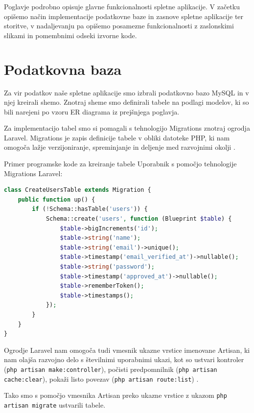 \documentclass[a4paper, 12pt]{book}
\begin{document}
Poglavje podrobno opisuje glavne funkcionalnosti spletne aplikacije. V začetku opišemo način implementacije podatkovne baze in zasnove spletne aplikacije ter storitve, v nadaljevanju pa opišemo posamezne funkcionalnosti z zaslonskimi slikami in pomembnimi odseki izvorne kode.


\section{Podatkovna baza}

Za vir podatkov naše spletne aplikacije smo izbrali podatkovno bazo MySQL in v njej kreirali shemo. Znotraj sheme smo definirali tabele na podlagi modelov, ki so bili narejeni po vzoru ER diagrama iz prejšnjega poglavja.
 
Za implementacijo tabel smo si pomagali s tehnologijo Migrations znotraj ogrodja Laravel. Migrations je zapis definicije tabele v obliki datoteke PHP, ki nam omogoča lažje verzijoniranje, spreminjanje in deljenje med razvojnimi okolji \cite{laravel-migrations}.

\clearpage

Primer programske kode za kreiranje tabele Uporabnik s pomočjo tehnologije Migrations Laravel:

\begin{lstlisting}[language=PHP, style=mystyle]
class CreateUsersTable extends Migration {
    public function up() {
        if (!Schema::hasTable('users')) {
            Schema::create('users', function (Blueprint $table) {
                $table->bigIncrements('id');
                $table->string('name');
                $table->string('email')->unique();
                $table->timestamp('email_verified_at')->nullable();
                $table->string('password');
                $table->timestamp('approved_at')->nullable();
                $table->rememberToken();
                $table->timestamps();
            });
        }
    }
}
\end{lstlisting}

Ogrodje Laravel nam omogoča tudi vmesnik ukazne vrstice imenovane Artisan, ki nam olajša razvojno delo s številnimi uporabnimi ukazi, kot so ustvari kontroler (\verb=php artisan make:controller=), počisti predpomnilnik (\verb=php artisan cache:clear=), pokaži listo povezav (\verb=php artisan route:list=) \cite{laravel-artisan}.

Tako smo s pomočjo vmesnika Artisan preko ukazne vrstice z ukazom \verb=php artisan migrate= ustvarili tabele.
\end{document}

